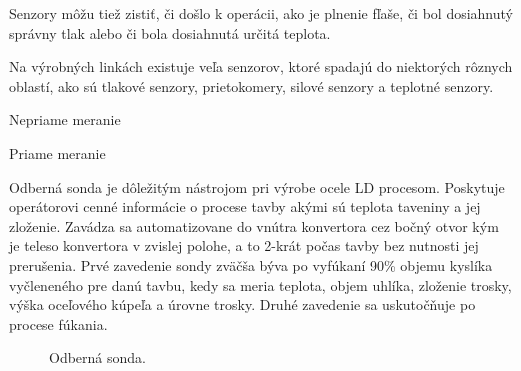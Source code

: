 \documentclass[]{tukediphc}
\begin{document}
Senzory môžu tiež zistiť, či došlo k operácii, ako je plnenie fľaše, či bol dosiahnutý správny tlak alebo či bola dosiahnutá určitá teplota.

Na výrobných linkách existuje veľa senzorov, ktoré spadajú do niektorých rôznych oblastí, ako sú tlakové senzory, prietokomery, silové senzory a teplotné senzory.

Nepriame meranie

Priame meranie

Odberná sonda je dôležitým nástrojom pri výrobe ocele LD procesom. Poskytuje operátorovi cenné informácie o procese tavby akými sú teplota taveniny a jej zloženie. Zavádza sa automatizovane do vnútra konvertora cez bočný otvor kým je teleso konvertora v zvislej polohe, a to 2-krát počas tavby bez nutnosti jej prerušenia. Prvé zavedenie sondy zväčša býva po vyfúkaní 90\% objemu kyslíka vyčleneného pre danú tavbu, kedy sa meria teplota, objem uhlíka, zloženie trosky, výška oceľového kúpeľa a úrovne trosky. Druhé zavedenie sa uskutočňuje po procese fúkania.

\begin{figure}[!ht]
	\centering
	\qquad
	\caption{Odberná sonda.}
\end{figure}
\end{document}

